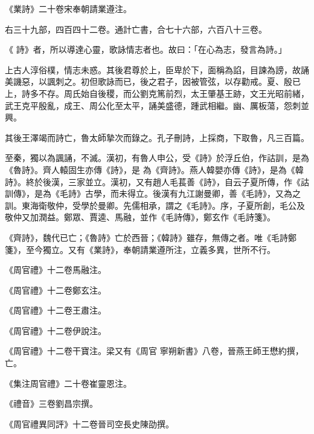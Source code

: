 \begin{pinyinscope}
 《業詩》二十卷宋奉朝請業遵注。



 右三十九部，四百四十二卷。通計亡書，合七十六部，六百八十三卷。



 《
 詩》者，所以導達心靈，歌詠情志者也。故曰：「在心為志，發言為詩。」



 上古人淳俗樸，情志未惑。其後君尊於上，臣卑於下，面稱為諂，目諫為謗，故誦美譏惡，以諷刺之。初但歌詠而已，後之君子，因被管弦，以存勸戒。夏、殷已上，詩多不存。周氏始自後稷，而公劉克篤前烈，太王肇基王跡，文王光昭前緒，武王克平殷亂，成王、周公化至太平，誦美盛德，踵武相繼。幽、厲板蕩，怨刺並興。



 其後王澤竭而詩亡，魯太師摯次而錄之。孔子刪詩，上採商，下取魯，凡三百篇。



 至秦，獨以為諷誦，不滅。漢初，有魯人申公，受《詩》於浮丘伯，作詁訓，是為《魯詩》。齊人轅固生亦傳《詩》，是
 為《齊詩》。燕人韓嬰亦傳《詩》，是為《韓詩》。終於後漢，三家並立。漢初，又有趙人毛萇善《詩》，自云子夏所傳，作《詁訓傳》，是為《毛詩》古學，而未得立。後漢有九江謝曼卿，善《毛詩》，又為之訓。東海衛敬仲，受學於曼卿。先儒相承，謂之《毛詩》。序，子夏所創，毛公及敬仲又加潤益。鄭眾、賈逵、馬融，並作《毛詩傳》，鄭玄作《毛詩箋》。



 《齊詩》，魏代已亡；《魯詩》亡於西晉；《韓詩》雖存，無傳之者。唯《毛詩鄭箋》，至今獨立。又有《業詩》，奉朝請業遵所注，立義多異，世所不行。



 《周官禮》十二卷馬融注。



 《周官禮》十二卷鄭玄注。



 《周官禮》十二卷王肅注。



 《周官禮》十二卷伊說注。



 《周官禮》十二卷干寶注。梁又有《周官
 寧朔新書》八卷，晉燕王師王懋約撰，亡。



 《集注周官禮》二十卷崔靈恩注。



 《禮音》三卷劉昌宗撰。



 《周官禮異同評》十二卷晉司空長史陳劭撰。




\end{pinyinscope}
